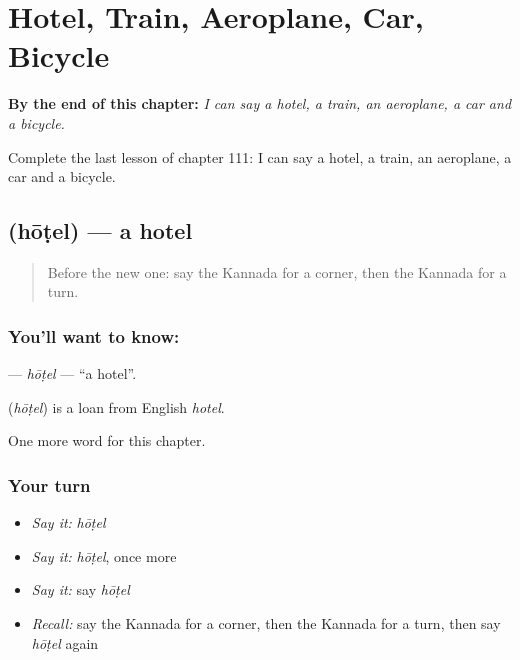 
\chapter{Hotel, Train, Aeroplane, Car, Bicycle}
\label{ch:ka-hotel-train-aeroplane-car-bicycle}

\begin{chapteropening}
\textbf{By the end of this chapter:} \emph{I can say a hotel, a train, an aeroplane, a car and a bicycle.}

Complete the last lesson of chapter 111: I can say a hotel, a train, an aeroplane, a car and a bicycle.
\end{chapteropening}

\section[\texorpdfstring{\kn{ಹೋಟೆಲ್} (hōṭel)}{ಹೋಟೆಲ್ (hōṭel)}]{ (hōṭel) — a hotel}

\label{lesson:KA-C111-hotel}



\begin{quote}
Before the new one: say the Kannada for a corner, then the Kannada for a turn.
\end{quote}

\subsection*{You'll want to know: }
\textbf{} — \emph{hōṭel} — \textquotedblleft{}a hotel\textquotedblright{}.

\begin{cousinweb}
\textbf{} (\emph{hōṭel}) is a loan from English \emph{hotel}.
\end{cousinweb}

\begin{grammarlens}[title={What you've built}]
One more word for this chapter.
\end{grammarlens}

\subsection*{Your turn}
\begin{itemize}
\raggedright
  \item \emph{Say it:} \emph{hōṭel}
  \item \emph{Say it:} \emph{hōṭel}, once more
  \item \emph{Say it:} say \emph{hōṭel}
  \item \emph{Recall:} say the Kannada for a corner, then the Kannada for a turn, then say \emph{hōṭel} again
\end{itemize}

